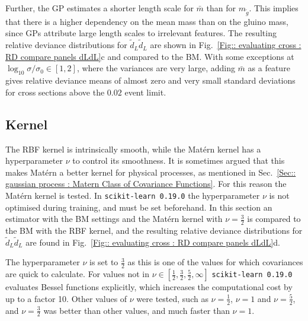 \documentclass[twoside,english]{uiofysmaster}
\begin{document}
{{Further, the GP estimates a shorter length scale for $\bar{m}$ than for $m_{\widetilde{g}}$. This implies that there is a higher dependency on the mean mass than on the gluino mass, since GPs attribute large length scales to irrelevant features. The resulting relative deviance distributions for $\widetilde{d}_L \widetilde{d}_L$ are shown in Fig.~\ref{Fig:: evaluating cross : RD compare panels dLdL}c and compared to the BM. With some exceptions at $\log_{10} \sigma/\sigma_0 \in [1,2]$, where the variances are very large, adding $\bar{m}$ as a feature gives relative deviance means of almost zero and very small standard deviations for cross sections above the $0.02$ event limit. 




\subsection{Kernel}

The RBF kernel is intrinsically smooth, while the Mat\'{e}rn kernel has a hyperparameter $\nu$ to control its smoothness. It is sometimes argued that this makes Mat\'{e}rn a better kernel for physical processes, as mentioned in Sec.~\ref{Sec:: gaussian process : Matern Class of Covariance Functions}. For this reason the Mat\'{e}rn kernel is tested. In \verb|scikit-learn 0.19.0| the hyperparameter $\nu$ is not optimised during training, and must be set beforehand. In this section an estimator with the BM settings and the Mat\'{e}rn kernel with $\nu=\frac{3}{2}$ is compared to the BM with the RBF kernel, and the resulting relative deviance distributions for $\widetilde{d}_L \widetilde{d}_L$ are found in Fig.~\ref{Fig:: evaluating cross : RD compare panels dLdL}d. 

The hyperparameter $\nu$ is set to $\frac{3}{2}$ as this is one of the values for which covariances are quick to calculate. For values not in $\nu \in [\frac{1}{2}, \frac{3}{2}, \frac{5}{2}, \infty]$ \verb|scikit-learn 0.19.0| evaluates Bessel functions explicitly, which increases the computational cost by up to a factor 10. Other values of $\nu$ were tested, such as $\nu = \frac{1}{2}$, $\nu = 1$ and $\nu = \frac{5}{2}$, and $\nu = \frac{3}{2}$ was better than other values, and much faster than $\nu = 1$.

}}
\end{document}
